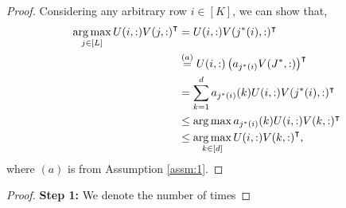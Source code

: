 \begin{proof}
Considering any arbitrary row $i\in [K]$, we can show that,
\begin{align*}
\mathop{\rm arg\,max}_{j\in[L]} U(i,:){V(j,:)}^{\intercal}  &= U(i,:)V(j^*(i),:)^{\intercal}\\
& \overset{(a)}{=} U(i,:)\left(a_{j^*(i)}V(J^*,:)\right)^{\intercal}\\
& = \sum_{k=1}^{d}a_{j^*(i)}(k)U(i,:)V(j^*(i),:)^{\intercal}\\
& \leq \mathop{\rm arg\,max} a_{j^*(i)}(k)U(i,:)V(k,:)^{\intercal} \\
& \leq \mathop{\rm arg\,max}_{k\in[d]}U(i,:){V(k,:)}^{\intercal}   ,
\end{align*}
where $(a)$ is from Assumption \ref{assm:1}.
\end{proof}

\begin{proof}
\textbf{Step 1:} We denote the number of times 
\end{proof}